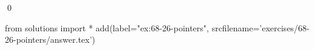 
\begin{ex}
  \label{ex:68-26-pointers}
  
  \qed
\end{ex}
\begin{python0}
from solutions import *
add(label="ex:68-26-pointers",
    srcfilename='exercises/68-26-pointers/answer.tex')
\end{python0}
